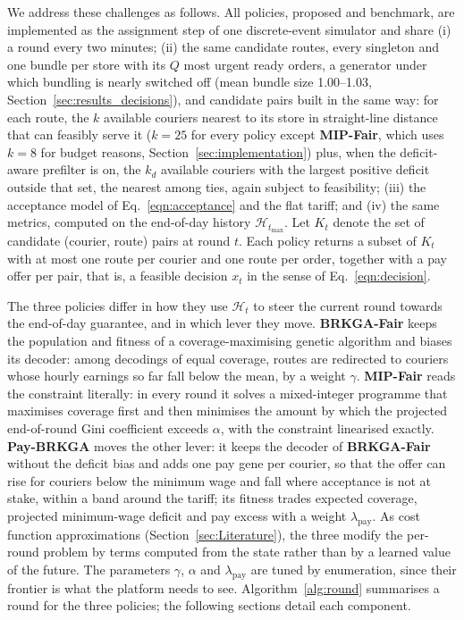 \documentclass[a4paper,11pt,review,3p,authoryear]{elsarticle}
\newcommand{\Hist}{\mathcal{H}}
\begin{document}
We address these challenges as follows. All policies, proposed and benchmark, are implemented as the assignment step of one discrete-event simulator and share (i) a round every two minutes; (ii) the same candidate routes, every singleton and one bundle per store with its $Q$ most urgent ready orders, a generator under which bundling is nearly switched off (mean bundle size 1.00--1.03, Section~\ref{sec:results_decisions}), and candidate pairs built in the same way: for each route, the $k$ available couriers nearest to its store in straight-line distance that can feasibly serve it ($k = 25$ for every policy except \textbf{MIP-Fair}, which uses $k = 8$ for budget reasons, Section~\ref{sec:implementation}) plus, when the deficit-aware prefilter is on, the $k_d$ available couriers with the largest positive deficit outside that set, the nearest among ties, again subject to feasibility; (iii) the acceptance model of Eq.~\eqref{eqn:acceptance} and the flat tariff; and (iv) the same metrics, computed on the end-of-day history $\Hist_{t_{\max}}$. Let $K_t$ denote the set of candidate (courier, route) pairs at round $t$. Each policy returns a subset of $K_t$ with at most one route per courier and one route per order, together with a pay offer per pair, that is, a feasible decision $x_t$ in the sense of Eq.~\eqref{eqn:decision}.

The three policies differ in how they use $\Hist_t$ to steer the current round towards the end-of-day guarantee, and in which lever they move. \textbf{BRKGA-Fair} keeps the population and fitness of a coverage-maximising genetic algorithm and biases its decoder: among decodings of equal coverage, routes are redirected to couriers whose hourly earnings so far fall below the mean, by a weight $\gamma$. \textbf{MIP-Fair} reads the constraint literally: in every round it solves a mixed-integer programme that maximises coverage first and then minimises the amount by which the projected end-of-round Gini coefficient exceeds $\alpha$, with the constraint linearised exactly. \textbf{Pay-BRKGA} moves the other lever: it keeps the decoder of \textbf{BRKGA-Fair} without the deficit bias and adds one pay gene per courier, so that the offer can rise for couriers below the minimum wage and fall where acceptance is not at stake, within a band around the tariff; its fitness trades expected coverage, projected minimum-wage deficit and pay excess with a weight $\lambda_{\text{pay}}$. As cost function approximations (Section~\ref{sec:Literature}), the three modify the per-round problem by terms computed from the state rather than by a learned value of the future. The parameters $\gamma$, $\alpha$ and $\lambda_{\text{pay}}$ are tuned by enumeration, since their frontier is what the platform needs to see. Algorithm~\ref{alg:round} summarises a round for the three policies; the following sections detail each component.
\end{document}
